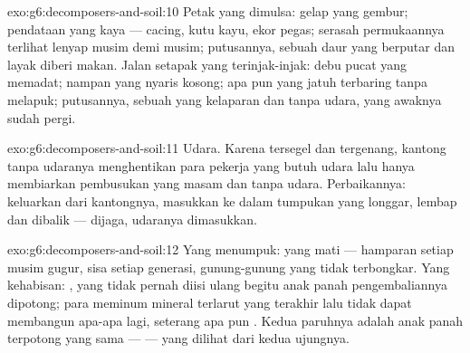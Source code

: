 \begin{solution}{exo:g6:decomposers-and-soil:10}
Petak yang dimulsa:  gelap yang gembur; pendataan yang kaya ---
cacing, kutu kayu, ekor pegas; serasah permukaannya terlihat lenyap
musim demi musim; putusannya, sebuah daur yang berputar dan layak
diberi makan. Jalan setapak yang terinjak-injak: debu pucat yang
memadat; nampan yang nyaris kosong; apa pun yang jatuh terbaring tanpa
melapuk; putusannya, sebuah  yang kelaparan dan tanpa udara, yang
awaknya sudah pergi.
\end{solution}

\begin{solution}{exo:g6:decomposers-and-soil:11}
Udara. Karena tersegel dan tergenang, kantong tanpa udaranya
menghentikan para pekerja yang butuh udara lalu hanya membiarkan
pembusukan yang masam dan tanpa udara. Perbaikannya: keluarkan dari
kantongnya, masukkan ke dalam tumpukan yang longgar, lembap dan
dibalik ---  dijaga, udaranya dimasukkan.
\end{solution}

\begin{solution}{exo:g6:decomposers-and-soil:12}
Yang menumpuk: yang mati --- hamparan setiap musim gugur, sisa setiap
generasi, gunung-gunung  yang tidak terbongkar. Yang
kehabisan:  , yang tidak pernah diisi ulang
begitu anak panah pengembaliannya dipotong; para  meminum
mineral terlarut yang terakhir lalu tidak dapat membangun apa-apa lagi,
seterang apa pun . Kedua paruhnya adalah anak panah terpotong
yang sama ---  --- yang dilihat dari kedua ujungnya.
\end{solution}

